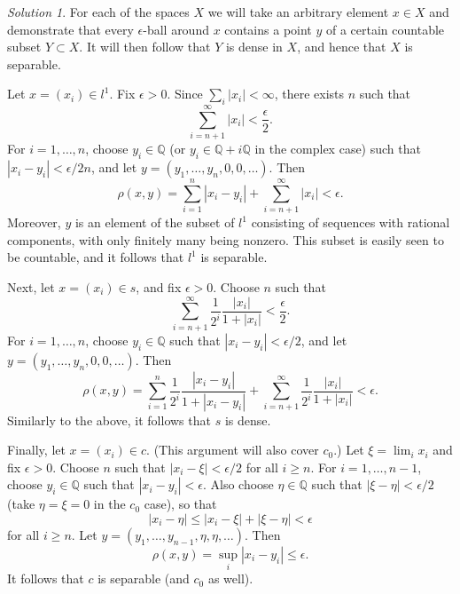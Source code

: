 \documentclass{report}
\newcommand{\bb}[1]{\mathbb{#1}}
\theoremstyle{remark}
\newtheorem*{solution}{Solution}
\begin{document}
\begin{solution}
  For each of the spaces $X$ we will take an arbitrary element $x \in X$ and demonstrate that every $\epsilon$-ball around $x$ contains a point $y$ of a certain countable subset $Y \subset X$. It will then follow that $Y$ is dense in $X$, and hence that $X$ is separable.

  Let $x = (x_i) \in l^1$. Fix $\epsilon > 0$. Since $\sum_i |x_i| < \infty$, there exists $n$ such that
  \begin{equation*}
    \sum_{i=n+1}^\infty |x_i| < \frac{\epsilon}{2}.
  \end{equation*}
  For $i = 1, \dots, n$, choose $y_i \in \bb Q$ (or $y_i \in \bb Q + i \bb Q$ in the complex case) such that $|x_i - y_i| < \epsilon/2n$, and let $y = (y_1, \dots, y_n, 0, 0, \dots)$. Then
  \begin{equation*}
    \rho(x,y) = \sum_{i=1}^n |x_i - y_i| + \sum_{i=n+1}^\infty |x_i| < \epsilon.
  \end{equation*}
  Moreover, $y$ is an element of the subset of $l^1$ consisting of sequences with rational components, with only finitely many being nonzero. This subset is easily seen to be countable, and it follows that $l^1$ is separable.

  Next, let $x = (x_i) \in s$, and fix $\epsilon > 0$. Choose $n$ such that
  \begin{equation*}
    \sum_{i=n+1}^\infty \frac{1}{2^i} \frac{|x_i|}{1 + |x_i|} < \frac{\epsilon}{2}.
  \end{equation*}
  For $i = 1, \dots, n$, choose $y_i \in \bb Q$ such that $|x_i - y_i| < \epsilon/2$, and let $y = (y_1, \dots, y_n, 0, 0, \dots)$. Then
  \begin{equation*}
    \rho(x,y) = \sum_{i=1}^n \frac{1}{2^i} \frac{|x_i - y_i|}{1 + |x_i - y_i|} + \sum_{i=n+1}^\infty \frac{1}{2^i} \frac{|x_i|}{1 + |x_i|} < \epsilon.
  \end{equation*}
  Similarly to the above, it follows that $s$ is dense.

  Finally, let $x = (x_i) \in c$. (This argument will also cover $c_0$.) Let $\xi = \lim_i x_i$ and fix $\epsilon > 0$. Choose $n$ such that $|x_i - \xi| < \epsilon/2$ for all $i \ge n$. For $i = 1, \dots, n-1$, choose $y_i \in \bb Q$ such that $|x_i - y_i| < \epsilon$. Also choose $\eta \in \bb Q$ such that $|\xi - \eta| < \epsilon/2$ (take $\eta = \xi = 0$ in the $c_0$ case), so that
  \begin{equation*}
    |x_i - \eta| \le |x_i - \xi| + |\xi - \eta| < \epsilon
  \end{equation*}
  for all $i \ge n$. Let $y = (y_1, \dots, y_{n-1}, \eta, \eta, \dots)$. Then
  \begin{equation*}
    \rho(x,y) = \sup_i |x_i - y_i| \le \epsilon.
  \end{equation*}
  It follows that $c$ is separable (and $c_0$ as well).
\end{solution}
\end{document}
